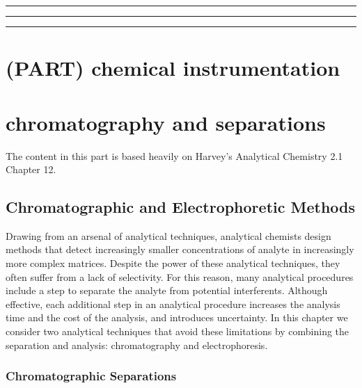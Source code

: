 \documentclass[
]{krantz}
\begin{document}
\begin{center}\rule{0.5\linewidth}{0.5pt}\end{center}

\begin{center}\rule{0.5\linewidth}{0.5pt}\end{center}

\begin{center}\rule{0.5\linewidth}{0.5pt}\end{center}

\hypertarget{part-chemical-instrumentation}{%
\section{(PART) chemical instrumentation}\label{part-chemical-instrumentation}}

\hypertarget{chromatography-and-separations}{%
\section*{chromatography and separations}\label{chromatography-and-separations}}

The content in this part is based heavily on Harvey's Analytical Chemistry 2.1 Chapter 12.

\hypertarget{chromatographic-and-electrophoretic-methods}{%
\subsection{Chromatographic and Electrophoretic Methods}\label{chromatographic-and-electrophoretic-methods}}

Drawing from an arsenal of analytical techniques, analytical chemists design methods that detect increasingly smaller concentrations of analyte in increasingly more complex matrices. Despite the power of these analytical techniques, they often suffer from a lack of selectivity. For this reason, many analytical procedures include a step to separate the analyte from potential interferents. Although effective, each additional step in an analytical procedure increases the analysis time and the cost of the analysis, and introduces uncertainty. In this chapter we consider two analytical techniques that avoid these limitations by combining the separation and analysis: chromatography and electrophoresis.

\hypertarget{chromatographic-separations}{%
\subsubsection{Chromatographic Separations}\label{chromatographic-separations}}
\end{document}
